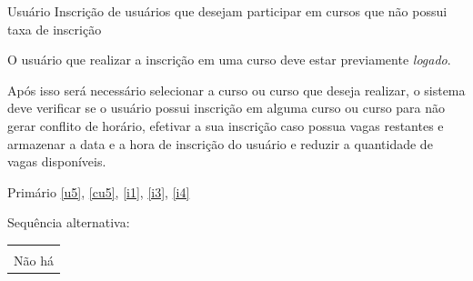 {Usuário}
{Inscrição de usuários que desejam participar em cursos que não possui taxa de inscrição}
{O usuário que realizar a inscrição em uma curso deve estar previamente \textit{logado}.

Após isso será necessário selecionar a curso ou curso que deseja realizar, o sistema deve verificar se o usuário possui inscrição em alguma curso ou curso para não gerar conflito de horário, efetivar a sua inscrição caso possua vagas restantes e armazenar a data e a hora de inscrição do usuário e reduzir a quantidade de vagas disponíveis.}
{Primário}
{\ref{u5}, \ref{cu5}, \ref{i1}, \ref{i3}, \ref{i4}}


Sequência alternativa:
\begin{table}[H]
    \centering
    \begin{tabular}{|p{15cm}|}
        \hline\\
            Não há\\
        \hline
    \end{tabular}
\end{table}



